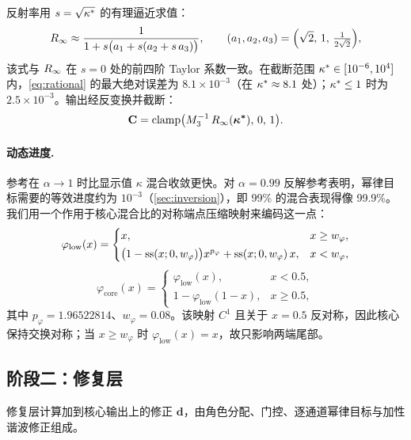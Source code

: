 反射率用 $s=\sqrt{\kappa^{\ast}}$ 的有理逼近求值：
\begin{equation}
R_{\infty}\approx\frac{1}{1+s\bigl(a_{1}+s(a_{2}+s\,a_{3})\bigr)},\qquad
(a_{1},a_{2},a_{3})=\Bigl(\sqrt{2},\,1,\,\tfrac{1}{2\sqrt{2}}\Bigr),
\label{eq:rational}
\end{equation}
该式与 $R_{\infty}$ 在 $s=0$ 处的前四阶 Taylor 系数一致。在截断范围 $\kappa^{\ast}\in[10^{-6},10^{4}]$ 内，\cref{eq:rational} 的最大绝对误差为 $8.1\times10^{-3}$（在 $\kappa^{\ast}\approx8.1$ 处）；$\kappa^{\ast}\le1$ 时为 $2.5\times10^{-3}$。输出经反变换并截断：
\begin{equation}
\mathbf{C}=\operatorname{clamp}\bigl(M_{3}^{-1}\,R_{\infty}(\boldsymbol{\kappa^{\ast}}),\,0,\,1\bigr).
\label{eq:core-output}
\end{equation}

\paragraph{动态进度.}
参考在 $\alpha\to1$ 时比显示值 $\kappa$ 混合收敛更快。对 $\alpha=0.99$ 反解参考表明，幂律目标需要的等效进度约为 $10^{-3}$（\cref{sec:inversion}），即 99\% 的混合表现得像 99.9\%。我们用一个作用于核心混合比的对称端点压缩映射来编码这一点：
\begin{equation}
\varphi_{\mathrm{low}}(x)=
\begin{cases}
x, & x\ge w_{\varphi},\\[2pt]
\bigl(1-\operatorname{ss}(x;0,w_{\varphi})\bigr)x^{p_{\varphi}}+\operatorname{ss}(x;0,w_{\varphi})\,x, & x<w_{\varphi},
\end{cases}
\label{eq:philow}
\end{equation}
\begin{equation}
\varphi_{\mathrm{core}}(x)=
\begin{cases}
\varphi_{\mathrm{low}}(x), & x<0.5,\\
1-\varphi_{\mathrm{low}}(1-x), & x\ge0.5,
\end{cases}
\label{eq:phicore}
\end{equation}
其中 $p_{\varphi}=1.96522814$、$w_{\varphi}=0.08$。该映射 $C^{1}$ 且关于 $x=0.5$ 反对称，因此核心保持交换对称；当 $x\ge w_{\varphi}$ 时 $\varphi_{\mathrm{low}}(x)=x$，故只影响两端尾部。

\subsection{阶段二：修复层}
\label{sec:repair}

修复层计算加到核心输出上的修正 $\mathbf{d}$，由角色分配、门控、逐通道幂律目标与加性谐波修正组成。

